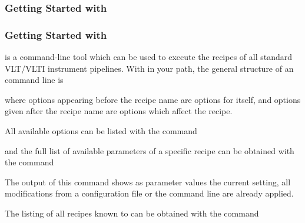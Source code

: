 \subsubsection{Getting Started with \gasgano{}}
\label{sec:gasgano-quick}


\subsubsection{Getting Started with \esorex{}}
\label{sec:esorex-quick}


\textit{\esorex{}} is a command-line tool which can be used to execute the
recipes of all standard VLT/VLTI instrument pipelines. With \textit{\esorex{}}
in your path, the general structure of an \textit{\esorex{}} 
command line is

\begin{shell}[fontsize=\small]
\end{shell}

where options appearing before the recipe name are options for
\textit{\esorex{}} itself, and options given after the recipe name are options
which affect the recipe. 

All available \textit{\esorex{}} options can be listed with the command
\begin{shell}[fontsize=\small]
\end{shell}

and the full list of available parameters of a specific recipe can be obtained
with the command 

\begin{shell}[fontsize=\small]
\end{shell}
The output of this command shows as parameter values the current setting, \ie
all modifications from a configuration file or the command line are already
applied.

The listing of all recipes known to \textit{\esorex{}} can be obtained with the command
\begin{shell}[fontsize=\small]
\end{shell}

